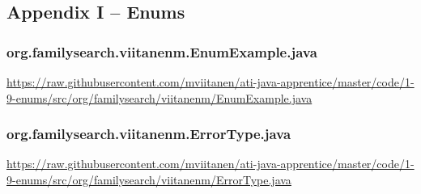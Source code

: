 \subsection*{Appendix I -- Enums} \label{App:AppendixI}

\subsubsection*{org.familysearch.viitanenm.EnumExample.java}
\noindent
\begin{minipage}{.6in}
\end{minipage}
\begin{minipage}{6in}
  \url{https://raw.githubusercontent.com/mviitanen/ati-java-apprentice/master/code/1-9-enums/src/org/familysearch/viitanenm/EnumExample.java}
\end{minipage}

\vspace{1em}
\subsubsection*{org.familysearch.viitanenm.ErrorType.java}
\noindent
\begin{minipage}{.6in}
\end{minipage}
\begin{minipage}{6in}
  \url{https://raw.githubusercontent.com/mviitanen/ati-java-apprentice/master/code/1-9-enums/src/org/familysearch/viitanenm/ErrorType.java}
\end{minipage}
